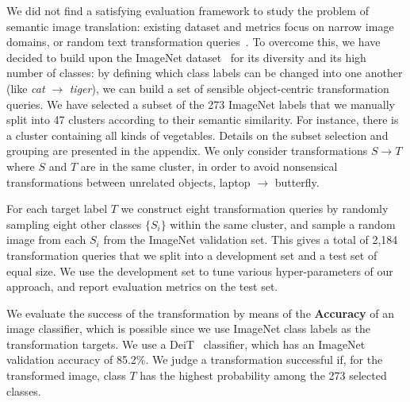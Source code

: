 We did not find a satisfying evaluation framework to study the problem of semantic image
 translation: existing dataset and metrics focus on narrow image domains, or random text
  transformation queries~\cite{li2020manigan,patashnik2021styleclip}. 
To overcome this, we have decided to build upon the ImageNet dataset~\cite{deng09cvpr}
 for its diversity and its high number of classes: by defining which class labels can be
  changed into one another (like \textit{cat} $\rightarrow$ \textit{tiger}), we can
   build a set
   of sensible object-centric transformation queries. 
We have selected a subset of the 273 ImageNet labels that we manually split into 47 
clusters according to their semantic similarity. For instance, there is a cluster 
containing all kinds of vegetables. Details on the subset selection and grouping are 
presented in the appendix.
%
We only consider  transformations  $S \rightarrow T$ where $S$ and $T$ are in the same 
cluster, in order to avoid nonsensical transformations between unrelated objects, \eg 
laptop $\rightarrow$ butterfly.

For each target label $T$ we construct eight transformation queries by randomly 
sampling eight other classes $\{S_i\}$ within the same cluster, and sample a random 
image from each $S_i$ from the ImageNet validation set.
This gives  a total of 2,184 transformation queries that we split into a development
 set and a test set of equal size.
We use the development set to tune various hyper-parameters of our approach, and 
report evaluation metrics on the test set.


%
We  evaluate the success of the transformation by means of the \textbf{Accuracy} of an 
image   classifier, which is possible since we use ImageNet class labels as the 
transformation targets.
%
We use a DeiT~\cite{touvron20arxiv2} classifier, which has an ImageNet validation 
accuracy of 85.2\%. 
We judge a transformation  successful if, for the transformed image, class $T$ has
 the highest  probability among the  273 selected classes.

